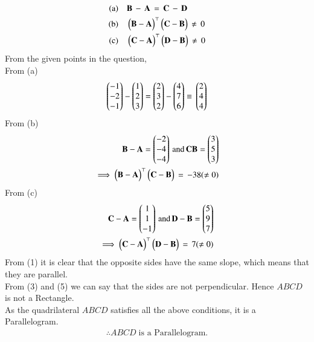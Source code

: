 \documentclass[journal,12pt,onecolumn]{IEEEtran}
\theoremstyle{remark}
\begin{document}
\begin{align*}
  (\text{a}) & \quad\mathbf{B}\,-\,\mathbf{A}\,=\,\mathbf{C}\,-\,\mathbf{D}\\
  (\text{b}) & \quad\begin{pmatrix}\mathbf{B-A}\end{pmatrix}^\top\begin{pmatrix}\mathbf{C-B}\end{pmatrix}\,\neq\,0\\
  (\text{c}) & \quad\begin{pmatrix}\mathbf{C-A}\end{pmatrix}^\top\begin{pmatrix}\mathbf{D-B}\end{pmatrix}\,\neq\,0
\end{align*}
From the given points in the question,\\
\hspace{1cm} From (a)\\
\begin{align}
   \begin{pmatrix}-1\\-2\\-1\end{pmatrix}-\begin{pmatrix}1\\2\\3\end{pmatrix}=\begin{pmatrix}2\\3\\2\end{pmatrix}-\begin{pmatrix}4\\7\\6\end{pmatrix}\equiv \, \begin{pmatrix}2\\4\\4\end{pmatrix}
\end{align}
From (b)
\begin{align}
    \mathbf{B}-\mathbf{A}=\begin{pmatrix}-2\\-4\\-4\end{pmatrix} \,\text{and}\, \mathbf{C} \mathbf{B}=\begin{pmatrix}3\\5\\3\end{pmatrix}\\
    \implies \begin{pmatrix}\mathbf{B-A}\end{pmatrix}^\top\begin{pmatrix}\mathbf{C-B}\end{pmatrix}\,=\,-38(\neq0)
\end{align}
From (c)
\begin{align}
    \mathbf{C}-\mathbf{A}=\begin{pmatrix}1\\1\\-1\end{pmatrix}\,\text{and}\, \mathbf{D}-\mathbf{B}=\begin{pmatrix}5\\9\\7\end{pmatrix}\\
    \implies \begin{pmatrix}\mathbf{C-A}\end{pmatrix}^\top\begin{pmatrix}\mathbf{D-B}\end{pmatrix}\,=\,7(\neq0)
\end{align}
From (1) it is clear that the opposite sides have the same slope, which means that they are parallel.\\
From (3) and (5) we can say that the sides are not perpendicular. Hence $ABCD$ is not a Rectangle.\\[4pt]
As the quadrilateral $ABCD$ satisfies all the above conditions, it is a Parallelogram.\\
\vspace{0.5cm}
\begin{align*}
    \therefore ABCD\; \text{is a Parallelogram.}
\end{align*}
\end{document}
